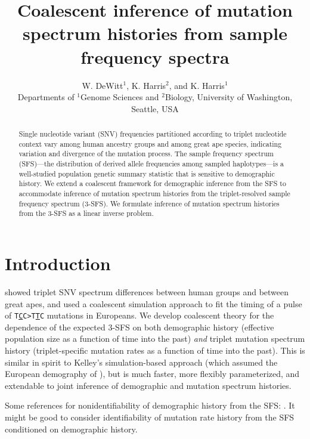 \documentclass[11pt]{article}
\title{Coalescent inference of mutation spectrum histories from sample frequency spectra}
\author{
W. DeWitt$^{1}$, K. Harris$^{2}$, and K. Harris$^{1}$\\
\small{Departments of $^1$Genome Sciences and $^2$Biology, University of Washington, Seattle, USA}
}
\begin{document}
\maketitle

\begin{abstract}

Single nucleotide variant (SNV) frequencies partitioned according to triplet nucleotide context vary among human ancestry groups and among great ape species, indicating variation and divergence of the mutation process.
The sample frequency spectrum (SFS)---the distribution of derived allele frequencies among sampled haplotypes---is a well-studied population genetic summary statistic that is sensitive to demographic history.
We extend a coalescent framework for demographic inference from the SFS to accommodate inference of mutation spectrum histories from the triplet-resolved sample frequency spectrum (3-SFS).
We formulate inference of mutation spectrum histories from the 3-SFS as a linear inverse problem.

\end{abstract}


\section{Introduction}\label{sec:intro}

\cite{Harris2017-fw} showed triplet SNV spectrum differences between human groups and between great apes, and used a coalescent simulation approach to fit the timing of a pulse of \texttt{T\underline{C}C>T\underline{T}C} mutations in Europeans.
We develop coalescent theory for the dependence of the expected 3-SFS on both demographic history (effective population size as a function of time into the past) \emph{and} triplet mutation spectrum history (triplet-specific mutation rates as a function of time into the past).
This is similar in spirit to Kelley's simulation-based approach (which assumed the European demography of \cite{Tennessen2012-dq}), but is much faster, more flexibly parameterized, and extendable to joint inference of demographic and mutation spectrum histories.

Some references for nonidentifiability of demographic history from the SFS: \cite{Baharian2018-np, Bhaskar2014-fu, Terhorst2015-xt, Myers2008-jp}.
It might be good to consider identifiability of mutation rate history from the SFS conditioned on demographic history.
\end{document}
